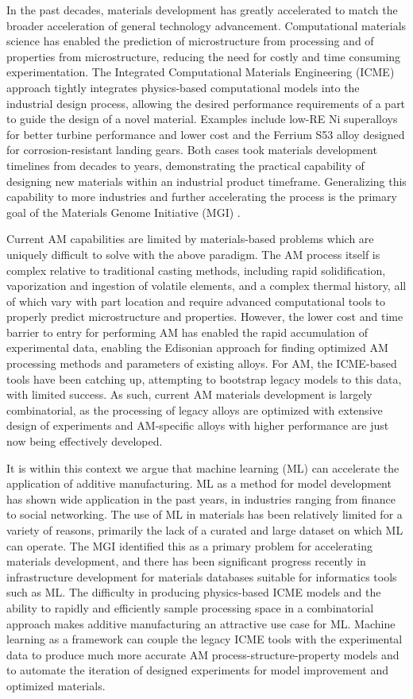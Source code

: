 In the past decades, materials development has greatly accelerated to match the broader acceleration of general technology advancement. Computational materials science has enabled the prediction of microstructure from processing and of properties from microstructure, reducing the need for costly and time consuming experimentation. The Integrated Computational Materials Engineering (ICME) approach tightly integrates physics-based computational models into the industrial design process, allowing the desired performance requirements of a part to guide the design of a novel material. Examples include low-RE Ni superalloys for better turbine performance and lower cost and the Ferrium S53 alloy designed for corrosion-resistant landing gears. Both cases took materials development timelines from decades to years, demonstrating the practical capability of designing new materials within an industrial product timeframe. Generalizing this capability to more industries and further accelerating the process is the primary goal of the Materials Genome Initiative (MGI) \cite{MGI}.

Current AM capabilities are limited by materials-based problems which are uniquely difficult to solve with the above paradigm. The AM process itself is complex relative to traditional casting methods, including rapid solidification, vaporization and ingestion of volatile elements, and a complex thermal history, all of which vary with part location and require advanced computational tools to properly predict microstructure and properties. However, the lower cost and time barrier to entry for performing AM has enabled the rapid accumulation of experimental data, enabling the Edisonian approach for finding optimized AM processing methods and parameters of existing alloys. For AM, the ICME-based tools have been catching up, attempting to bootstrap legacy models to this data, with limited success. As such, current AM materials development is largely combinatorial, as the processing of legacy alloys are optimized with extensive design of experiments and AM-specific alloys with higher performance are just now being effectively developed.

It is within this context we argue that machine learning (ML) can accelerate the application of additive manufacturing. ML as a method for model development has shown wide application in the past years, in industries ranging from finance to social networking. The use of ML in materials has been relatively limited for a variety of reasons, primarily the lack of a curated and large dataset on which ML can operate. The MGI identified this as a primary problem for accelerating materials development, and there has been significant progress recently in infrastructure development for materials databases suitable for informatics tools such as ML. The difficulty in producing physics-based ICME models and the ability to rapidly and efficiently sample processing space in a combinatorial approach makes additive manufacturing an attractive use case for ML. Machine learning as a framework can couple the legacy ICME tools with the experimental data to produce much more accurate AM process-structure-property models and to automate the iteration of designed experiments for model improvement and optimized materials.

